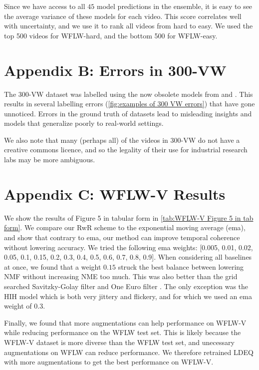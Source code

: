 \documentclass[10pt,twocolumn,letterpaper]{article}
\begin{document}
Since we have access to all $45$ model predictions in the ensemble, it is easy to see the average variance of these models for each video. This score correlates well with uncertainty, and we use it to rank all videos from hard to easy. We used the top 500 videos for WFLW-hard, and the bottom 500 for WFLW-easy.

\section*{\large{Appendix B: Errors in 300-VW}}

The 300-VW dataset \cite{Shen2015FirstFacialLandmarkTracking} was labelled using the now obsolete models from \cite{Chrysos2015DeformableFaceTracking} and \cite{Tzimiropoulos2015ProjectOutCascadedRegression}. This results in several labelling errors (\cref{fig:examples of 300 VW errors}) that have gone unnoticed. Errors in the ground truth of datasets lead to misleading insights and models that generalize poorly to real-world settings. 

We also note that many (perhaps all) of the videos in 300-VW do not have a creative commons licence, and so the legality of their use for industrial research labs may be more ambiguous. 


\section*{\large{Appendix C: WFLW-V Results}}

We show the results of Figure 5 in tabular form in \cref{tab:WFLW-V Figure 5 in tab form}. We compare our RwR scheme to the exponential moving average (ema), and show that contrary to ema, our method can improve temporal coherence without lowering accuracy. We tried the following ema weights: [0.005, 0.01, 0.02, 0.05, 0.1, 0.15, 0.2, 0.3, 0.4, 0.5, 0.6, 0.7, 0.8, 0.9]. When considering all baselines at once, we found that a weight $0.15$ struck the best balance between lowering NMF without increasing NME too much. This was also better than the grid searched Savitzky-Golay filter \cite{SavitzkyGolay1964Filter} and One Euro filter \cite{Casiez2012OneEuroFilter}. The only exception was the HIH model which is both very jittery and flickery, and for which we used an ema weight of 0.3.

Finally, we found that more augmentations can help performance on WFLW-V while reducing performance on the WFLW test set. This is likely because the WFLW-V dataset is more diverse than the WFLW test set, and unecessary augmentations on WFLW can reduce performance. We therefore retrained LDEQ with more augmentations to get the best performance on WFLW-V.
\end{document}

